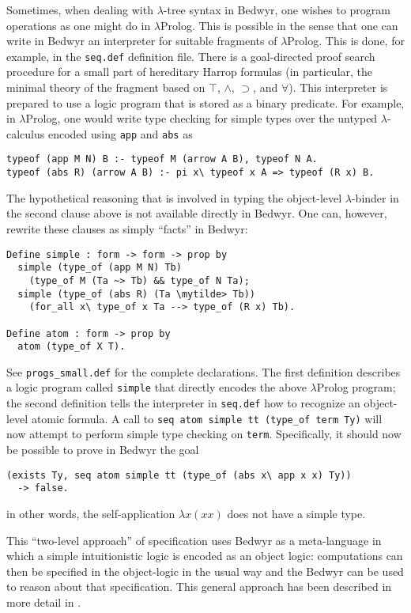 \documentclass{article}
\newcommand{\mytilde}{\raise.27ex\hbox{$\scriptstyle\sim$}}
\newcommand{\lp}{$\lambda$Prolog}
\begin{document}
Sometimes, when dealing with $\lambda$-tree syntax in Bedwyr, one
wishes to program operations as one might do in \lp{}.  This is possible
in the sense that one can write in Bedwyr an interpreter for suitable
fragments of \lp{}.  This is done, for example, in the {\tt seq.def}
definition file.  There is a goal-directed proof search procedure for a
small part of hereditary Harrop formulas (in particular, the minimal
theory of the fragment based on $\top$, $\wedge$, $\supset$, and
$\forall$).  This interpreter is prepared to use a logic program that
is stored as a binary predicate.  For example, in \lp{}, one would write
type checking for simple types over the untyped $\lambda$-calculus
encoded using {\tt app} and {\tt abs} as
\begin{verbatim}
typeof (app M N) B :- typeof M (arrow A B), typeof N A.
typeof (abs R) (arrow A B) :- pi x\ typeof x A => typeof (R x) B.
\end{verbatim}
The hypothetical reasoning that is involved in typing the object-level
$\lambda$-binder in the second clause above is not available directly
in Bedwyr.  One can, however, rewrite these clauses as simply
``facts'' in Bedwyr:
\begin{Verbatim}
Define simple : form -> form -> prop by
  simple (type_of (app M N) Tb)
    (type_of M (Ta ~> Tb) && type_of N Ta);
  simple (type_of (abs R) (Ta \mytilde> Tb))
    (for_all x\ type_of x Ta --> type_of (R x) Tb).

Define atom : form -> prop by
  atom (type_of X T).
\end{Verbatim}
See \verb+progs_small.def+ for the complete declarations. The first
definition describes a logic program called {\tt simple} that directly
encodes the above \lp{} program; the second definition tells the
interpreter in {\tt seq.def} how to recognize an object-level atomic
formula.  A call to \verb+seq atom simple tt (type_of term Ty)+ will now
attempt to perform simple type checking on {\tt term}.  Specifically, it
should now be possible to prove in Bedwyr the goal
\begin{verbatim}
(exists Ty, seq atom simple tt (type_of (abs x\ app x x) Ty))
  -> false.
\end{verbatim}
in other words, the self-application $\lambda x(x x)$ does not have a
simple type.

This ``two-level approach'' of specification uses Bedwyr as a
meta-language in which a simple intuitionistic logic is encoded as an
object logic: computations can then be specified in the object-logic
in the usual way and the Bedwyr can be used to reason about that specification.
This general approach has been described in more detail in
\cite{miller06ijcar}.
\end{document}

